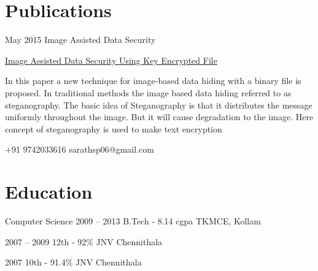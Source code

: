 \documentclass{tccv}
\begin{document}
\section{Publications}

\begin{eventlist}
\item{May 2015}{   }
     {Image Assisted Data Security}
     
\href{http://www.ijert.org/view-pdf/13070/image-assisted-data-security-using-key-encrypted-file}{Image Assisted Data Security Using Key Encrypted File}

In this paper a new technique for image-based data hiding with a binary file is proposed. In traditional methods the image based data hiding referred to as steganography. The basic idea of Steganography is that it distributes the message uniformly throughout the image. But it will cause degradation to the image. Here concept of steganography is used to make text encryption

\end{eventlist}


    {+91 9742033616}
    {sarathsp06@gmail.com}

\section{Education}

\begin{yearlist}

\item[Computer Science]{2009 -- 2013}
     {B.Tech - 8.14 cgpa }
     {TKMCE, Kollam }

\item{2007 -- 2009}
     {12th - 92\% }
     {JNV Chennithala}

\item{2007 }
     {10th - 91.4\% }
     {JNV Chennithala}


\end{yearlist}



\end{document}
